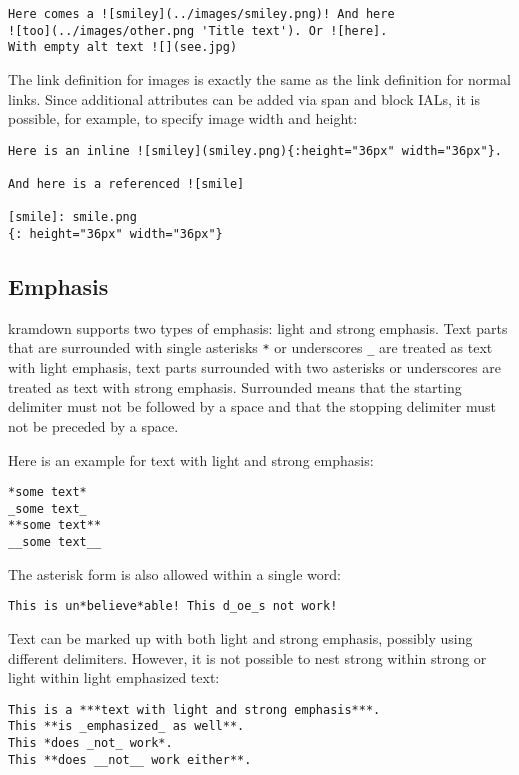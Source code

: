 \documentclass[a4paper]{article}
\begin{document}
\begin{verbatim}
Here comes a ![smiley](../images/smiley.png)! And here
![too](../images/other.png 'Title text'). Or ![here].
With empty alt text ![](see.jpg)
\end{verbatim}

The link definition for images is exactly the same as the link
definition for normal links. Since additional attributes can be added
via span and block IALs, it is possible, for example, to specify image
width and height:

\begin{verbatim}
Here is an inline ![smiley](smiley.png){:height="36px" width="36px"}.

And here is a referenced ![smile]

[smile]: smile.png
{: height="36px" width="36px"}
\end{verbatim}

\hypertarget{emphasis}{\subsection{Emphasis}\label{emphasis}}

kramdown supports two types of emphasis: light and strong emphasis. Text
parts that are surrounded with single asterisks \texttt{*} or
underscores \texttt{\_} are treated as text with light emphasis, text
parts surrounded with two asterisks or underscores are treated as text
with strong emphasis. Surrounded means that the starting delimiter must
not be followed by a space and that the stopping delimiter must not be
preceded by a space.

Here is an example for text with light and strong emphasis:

\begin{verbatim}
*some text*
_some text_
**some text**
__some text__
\end{verbatim}

The asterisk form is also allowed within a single word:

\begin{verbatim}
This is un*believe*able! This d_oe_s not work!
\end{verbatim}

Text can be marked up with both light and strong emphasis, possibly
using different delimiters. However, it is not possible to nest strong
within strong or light within light emphasized text:

\begin{verbatim}
This is a ***text with light and strong emphasis***.
This **is _emphasized_ as well**.
This *does _not_ work*.
This **does __not__ work either**.
\end{verbatim}
\end{document}
